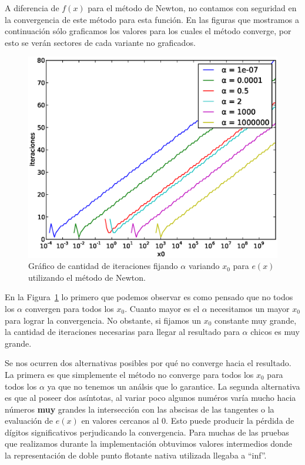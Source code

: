 A diferencia de $f(x)$ para el método de Newton, no contamos con seguridad en
la convergencia de este método para esta función. En las figuras que mostramos
a continuación sólo graficamos los valores para los cuales el método converge,
por esto se verán sectores de cada variante no graficados.

\begin{figure}[!htbp]
  \begin{center}
    \includegraphics[scale=0.5]{graficos/new/e_newton_x0_variable.eps}
    \caption{\label{fig:e_newton_x0_variable} Gráfico de cantidad de iteraciones fijando $\alpha$ variando $x_0$ para $e(x)$ utilizando el método de Newton.}
  \end{center}
\end{figure}

En la Figura~\ref{fig:e_newton_x0_variable} lo primero que podemos observar es
como pensado que no todos los $\alpha$ convergen para todos los $x_0$. Cuanto
mayor es el $\alpha$ necesitamos un mayor $x_0$ para lograr la convergencia. No
obstante, si fijamos un $x_0$ constante muy grande, la cantidad de iteraciones
necesarias para llegar al resultado para $\alpha$ chicos es muy grande.

Se nos ocurren dos alternativas posibles por qué no converge hacia el
resultado. La primera es que simplemente el método no converge para todos los
$x_0$ para todos los $\alpha$ ya que no tenemos un análsis que lo garantice.
La segunda alternativa es que al poseer dos asíntotas, al variar poco algunos
numéros varía mucho hacia números \textbf{muy} grandes la intersección con las
abscisas de las tangentes o la evaluación de $e(x)$ en valores cercanos al $0$.
Esto puede producir la pérdida de dígitos significativos perjudicando la
convergencia. Para muchas de las pruebas que realizamos durante la
implementación obtuvimos valores intermedios donde la representación de doble
punto flotante nativa utilizada llegaba a ``inf''.

